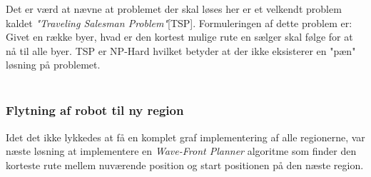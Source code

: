 \begin{itemize}
\end{itemize}
Det er værd at nævne at problemet der skal løses her er et velkendt problem kaldet \textit{"Traveling Salesman Problem"}[TSP]. Formuleringen af dette problem er: Givet en række byer, hvad er den kortest mulige rute en sælger skal følge for at nå til alle byer. TSP er NP-Hard hvilket betyder at der ikke eksisterer en "pæn" løsning på problemet. \\~\\


\subsubsection{Flytning af robot til ny region}

Idet det ikke lykkedes at få en komplet graf implementering af alle regionerne, var næste løsning at implementere en \emph{Wave-Front Planner} algoritme som finder den korteste rute mellem nuværende position og start positionen på den næste region.




